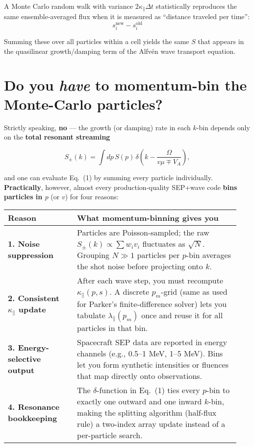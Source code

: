 A Monte Carlo random walk with variance $2\kappa_\parallel \Delta t$ statistically reproduces the same ensemble-averaged flux when it is measured as ``distance traveled per time'':
\[
s_i^{\text{new}} - s_i^{\text{old}}
\]

Summing these over all particles within a cell yields the same $S$ that appears in the quasilinear growth/damping term of the Alfvén wave transport equation.



\section*{Do you \emph{have} to momentum-bin the Monte-Carlo particles?}

Strictly speaking, \textbf{no} — the growth (or damping) rate in each $k$-bin depends only on the \textbf{total resonant streaming}

\begin{equation}
S_\pm(k) = \int dp\, S(p)\, 
\delta\!\left(k - \frac{\Omega}{v\mu \mp V_A} \right),
\tag{1}
\end{equation}

and one can evaluate Eq.~(1) by summing every particle individually. \textbf{Practically}, however, almost every production‐quality SEP+wave code \textbf{bins particles in $p$} (or $v$) for four reasons:

\begin{table}[h]
\centering
\begin{tabular}{|p{0.28\linewidth}|p{0.66\linewidth}|}
\hline
\textbf{Reason} & \textbf{What momentum-binning gives you} \\
\hline
\textbf{1. Noise suppression} &
Particles are Poisson-sampled; the raw $S_\pm(k) \propto \sum w_i v_i$ fluctuates as $\sqrt{N}$. Grouping $N \gg 1$ particles per $p$-bin averages the shot noise before projecting onto $k$. \\
\hline
\textbf{2. Consistent $\kappa_\parallel$ update} &
After each wave step, you must recompute $\kappa_\parallel(p,s)$. A discrete $p_m$-grid (same as used for Parker’s finite-difference solver) lets you tabulate $\lambda_\parallel(p_m)$ once and reuse it for all particles in that bin. \\
\hline
\textbf{3. Energy-selective output} &
Spacecraft SEP data are reported in energy channels (e.g., 0.5–1 MeV, 1–5 MeV). Bins let you form synthetic intensities or fluences that map directly onto observations. \\
\hline
\textbf{4. Resonance bookkeeping} &
The $\delta$-function in Eq.~(1) ties every $p$-bin to exactly one outward and one inward $k$-bin, making the splitting algorithm (half-flux rule) a two-index array update instead of a per-particle search. \\
\hline
\end{tabular}
\end{table}

